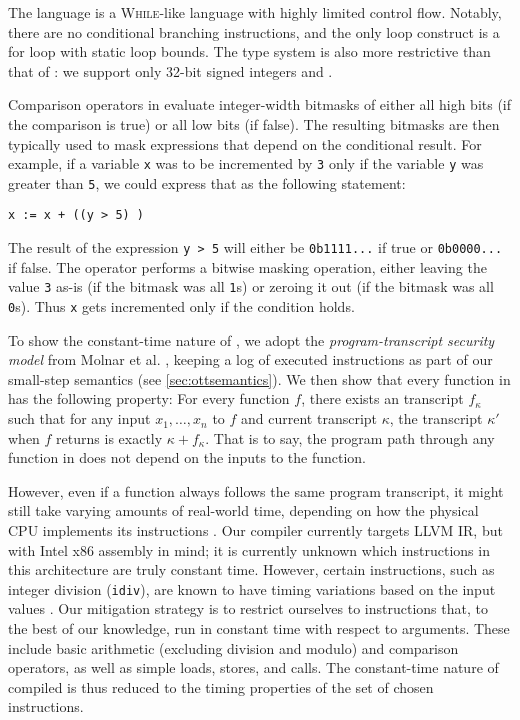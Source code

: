 The \ccore language is a \textsc{While}-like language \cite{ref:while} with highly limited
control flow. Notably, there are no conditional branching instructions, and the
only loop construct is a for loop with static loop bounds. The type system
is also more restrictive than that of \constc: we support only 32-bit
signed integers and \bytearrays.

Comparison operators in \ccore evaluate integer-width bitmasks of either all
high bits (if the comparison is true) or all low bits (if false). The resulting
bitmasks are then typically used to mask expressions that depend on the conditional
result. For example, if a variable \texttt{x} was to be incremented by \texttt{3}
only if the variable \texttt{y} was greater than \texttt{5}, we could express that
as the following statement:
\begin{center} \texttt{x := x + ((y > 5) )} \end{center}
The result of the expression \texttt{y > 5} will either be \texttt{0b1111...} if true
or \texttt{0b0000...} if false. The \band operator performs a bitwise masking operation,
either leaving the value \texttt{3} as-is (if the bitmask was all \texttt{1}s) or zeroing
it out (if the bitmask was all \texttt{0}s). Thus \texttt{x} gets incremented only
if the condition holds.

To show the constant-time nature of \ccore, we adopt the
\emph{program-transcript security model} from Molnar et al. \cite{molnar2005},
keeping a log of executed instructions as part of our small-step
semantics (see \autoref{sec:ottsemantics}). We then show that every function in
\ccore has the following property: For every function $f$, there exists an
transcript $f_\kappa$ such that for any input $x_1,\dots,x_n$ to $f$ and
current transcript $\kappa$, the transcript $\kappa'$ when $f$ returns is
exactly $\kappa + f_\kappa$. That is to say, the program path through any
function in \ccore does not depend on the inputs to the function.

However, even if a function always follows the same program transcript,
it might still take varying amounts of real-world time, depending
on how the physical CPU implements its instructions . Our compiler
currently targets LLVM IR, but with Intel x86 assembly in mind; it is currently unknown  which instructions in this architecture are truly constant time. However, certain
instructions, such as integer division (\texttt{idiv}), are known to have timing variations
based on the input values . Our
mitigation strategy is to restrict ourselves to instructions that, to the best of our knowledge,
run in constant time with respect to arguments.
These include basic arithmetic (excluding division and modulo) and comparison operators, as well as
simple loads, stores, and calls. The constant-time nature of compiled
\ccore is thus reduced to the timing properties of the set of chosen instructions.

